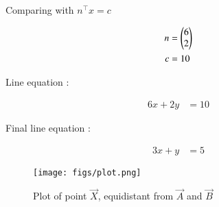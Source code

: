 \documentclass[journal]{IEEEtran}
\begin{document}
Comparing with $n^\top x=c$

\begin{align}
	n&=\begin{pmatrix}6 \\ 2\end{pmatrix}\\
	c&=10
\end{align}

Line equation :

\begin{align}
	6x+2y&=10
\end{align}

Final line equation :

\begin{align}
	3x+y&=5
\end{align}

\begin{figure}[h!]
   \centering
   \texttt{[image: figs/plot.png]}
   \caption{Plot of point $\vec{X}$, equidistant from $\vec{A}$ and $\vec{B}$}
\label{stemplot}
\end{figure}
\end{document}
